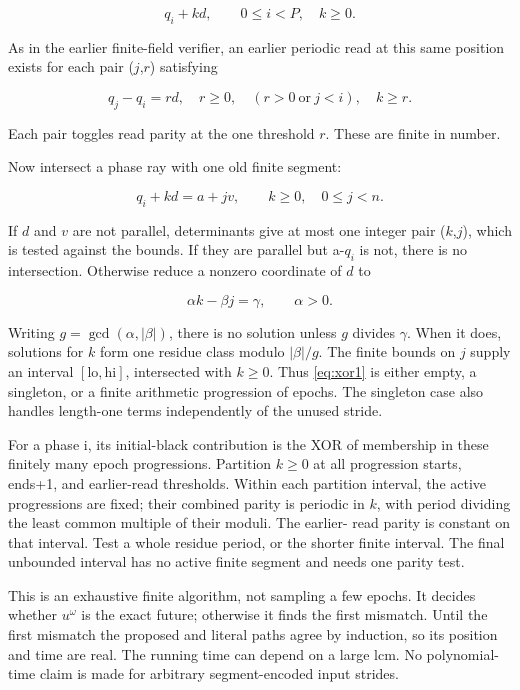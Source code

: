 \documentclass[
  11pt,
]{article}
\begin{document}
\[
q_i+kd,\qquad0\le i<P,\quad k\ge0.
\]

As in the earlier finite-field verifier, an earlier periodic read at
this same position exists for each pair (\(j\),\(r\)) satisfying

\[
q_j-q_i=rd,\quad r\ge0,\quad(r>0\ \text{or}\ j<i),\quad k\ge r.
\]

Each pair toggles read parity at the one threshold \(r\). These are finite
in number.

Now intersect a phase ray with one old finite segment:

\begin{equation}\label{eq:xor1}
q_i+kd=a+jv,\qquad k\ge0,\quad0\le j<n.
\end{equation}

If \(d\) and \(v\) are not parallel, determinants give at most one integer pair
(\(k\),\(j\)), which is tested against the bounds. If they are parallel but
a-$q_i$ is not, there is no intersection. Otherwise reduce a nonzero
coordinate of \(d\) to

\[
\alpha k-\beta j=\gamma,\qquad \alpha>0.
\]

Writing \(g=\gcd(\alpha,|\beta|)\), there is no solution unless \(g\)
divides \(\gamma\). When it does, solutions for \(k\) form one residue class modulo
\(|\beta|/g\). The finite bounds on \(j\) supply an interval
\([\mathrm{lo},\mathrm{hi}]\), intersected with $k\ge0$. Thus \eqref{eq:xor1} is either
empty, a singleton, or a finite arithmetic progression of epochs. The
singleton case also handles length-one terms independently of the unused
stride.

For a phase i, its initial-black contribution is the XOR of membership
in these finitely many epoch progressions. Partition $k\ge0$ at
all progression starts, ends+1, and earlier-read thresholds. Within each
partition interval, the active progressions are fixed; their combined
parity is periodic in \(k\), with period dividing the least common multiple
of their moduli. The earlier- read parity is constant on that interval.
Test a whole residue period, or the shorter finite interval. The final
unbounded interval has no active finite segment and needs one parity
test.

This is an exhaustive finite algorithm, not sampling a few epochs. It
decides whether $u^\omega$ is the exact future; otherwise it finds the
first mismatch. Until the first mismatch the proposed and literal paths
agree by induction, so its position and time are real. The running time
can depend on a large lcm. No polynomial-time claim is made for
arbitrary segment-encoded input strides.
\end{document}

